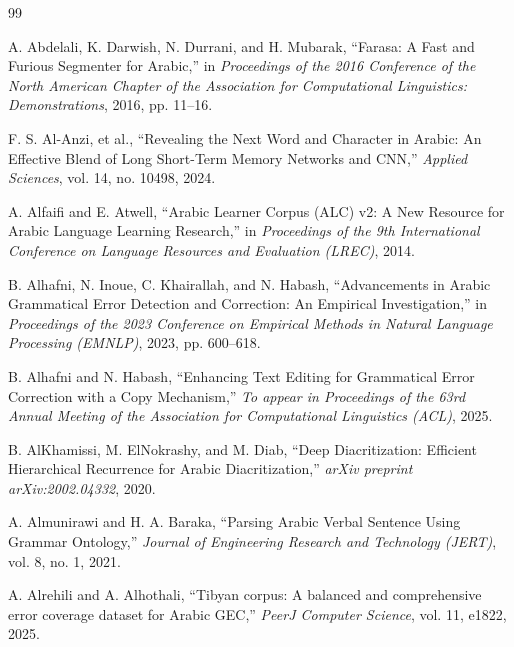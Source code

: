 \documentclass{article}
\begin{document}
\renewcommand\refname{\textcolor{accentred}{References}}
\begin{thebibliography}{99}

A. Abdelali, K. Darwish, N. Durrani, and H. Mubarak, 
``Farasa: A Fast and Furious Segmenter for Arabic,'' 
in \textit{Proceedings of the 2016 Conference of the North American Chapter of the Association for Computational Linguistics: Demonstrations}, 2016, pp. 11–16.

F. S. Al-Anzi, et al., 
``Revealing the Next Word and Character in Arabic: An Effective Blend of Long Short-Term Memory Networks and CNN,'' 
\textit{Applied Sciences}, vol. 14, no. 10498, 2024.

A. Alfaifi and E. Atwell, 
``Arabic Learner Corpus (ALC) v2: A New Resource for Arabic Language Learning Research,'' 
in \textit{Proceedings of the 9th International Conference on Language Resources and Evaluation (LREC)}, 2014.

B. Alhafni, N. Inoue, C. Khairallah, and N. Habash, 
``Advancements in Arabic Grammatical Error Detection and Correction: An Empirical Investigation,'' 
in \textit{Proceedings of the 2023 Conference on Empirical Methods in Natural Language Processing (EMNLP)}, 2023, pp. 600–618.

B. Alhafni and N. Habash, 
``Enhancing Text Editing for Grammatical Error Correction with a Copy Mechanism,'' 
\textit{To appear in Proceedings of the 63rd Annual Meeting of the Association for Computational Linguistics (ACL)}, 2025.

B. AlKhamissi, M. ElNokrashy, and M. Diab, 
``Deep Diacritization: Efficient Hierarchical Recurrence for Arabic Diacritization,'' 
\textit{arXiv preprint arXiv:2002.04332}, 2020.

A. Almunirawi and H. A. Baraka, 
``Parsing Arabic Verbal Sentence Using Grammar Ontology,'' 
\textit{Journal of Engineering Research and Technology (JERT)}, vol. 8, no. 1, 2021.

A. Alrehili and A. Alhothali, 
``Tibyan corpus: A balanced and comprehensive error coverage dataset for Arabic GEC,'' 
\textit{PeerJ Computer Science}, vol. 11, e1822, 2025.


\end{thebibliography}
\end{document}
